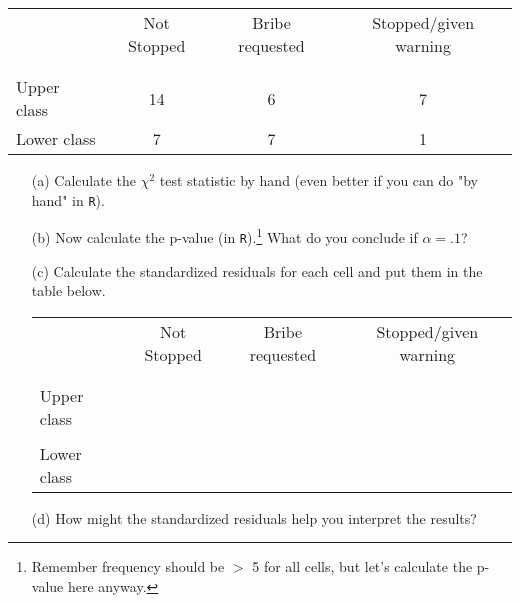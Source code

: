 \documentclass[12pt,letterpaper]{article}
\begin{document}
	\newpage
	\begin{table}[h!]
		\centering
		\begin{tabular}{l | c c c }
			& Not Stopped & Bribe requested & Stopped/given warning \\
	\\[-1.8ex] 
\hline \\[-1.8ex]
			Upper class & 14 & 6 & 7 \\
			Lower class & 7 & 7 & 1 \\
			\hline
		\end{tabular}
	\end{table}
	
	\begin{enumerate}
		
		\item [(a)]
		Calculate the $\chi^2$ test statistic by hand (even better if you can do "by hand" in \texttt{R}).\\
		\vspace{7cm}
		
		\item [(b)]
		Now calculate the p-value (in \texttt{R}).\footnote{Remember frequency should be $>$ 5 for all cells, but let's calculate the p-value here anyway.}  What do you conclude if $\alpha = .1$?\\
		
		\newpage
		\item [(c)] Calculate the standardized residuals for each cell and put them in the table below.
				\vspace{1cm}
		
		\begin{table}[h]
			\centering
			\begin{tabular}{l | c c c }
				& Not Stopped & Bribe requested & Stopped/given warning \\
	\\[-1.8ex] 
\hline \\[-1.8ex]
				Upper class  &  &  &  \\
				\\
				Lower class &  &   &   \\
				
			\end{tabular}
		\end{table}
		
		
		\vspace{7cm}
		\item [(d)] How might the standardized residuals help you interpret the results?  
		
	\end{enumerate}
\newpage
	
\end{document}
